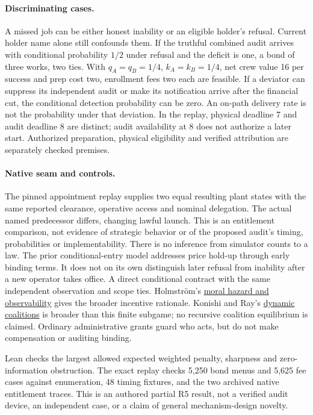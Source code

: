 \documentclass[11pt]{article}
\begin{document}
\paragraph{Discriminating cases.}
A missed job can be either honest inability or an eligible holder's
refusal. Current holder name alone still confounds them. If the
truthful combined audit arrives with conditional probability \(1/2\)
under refusal and the deficit is one, a bond of three works, two ties.
With \(q_A=q_B=1/4\), \(k_A=k_B=1/4\), net crew value 16 per success
and prep cost two, enrollment fees two each are feasible. If a
deviator can suppress its independent audit or make its notification
arrive after the financial cut, the conditional detection probability
can be zero. An on-path delivery rate is not the probability under
that deviation. In the replay, physical deadline 7 and audit
deadline 8 are distinct; audit availability at 8 does not authorize
a later start. Authorized preparation, physical eligibility and
verified attribution are separately checked premises.

\paragraph{Native seam and controls.}
The pinned appointment replay supplies two equal resulting plant
states with the same reported clearance, operative access and nominal
delegation. The actual named predecessor differs, changing lawful
launch. This is an entitlement comparison, not evidence of strategic
behavior or of the proposed audit's timing, probabilities or
implementability. There is no inference from simulator counts to a law.
The prior conditional-entry model addresses price hold-up through
early binding terms. It does not on its own distinguish later refusal
from inability after a new operator takes office. A direct conditional
contract with the same independent observation and scope ties.
Holmstr\"om's \href{https://personal.utdallas.edu/~nina.baranchuk/Fin7310/papers/Holmstrom1979.pdf}{moral hazard and observability}
gives the broader incentive rationale. Konishi and Ray's
\href{https://pages.nyu.edu/debraj/Papers/KonishiRay.pdf}{dynamic
coalitions} is broader than this finite subgame; no recursive
coalition equilibrium is claimed. Ordinary administrative grants
guard who acts, but do not make compensation or auditing binding.

Lean checks the largest allowed expected weighted penalty, sharpness
and zero-information obstruction. The exact replay checks 5,250
bond menus and 5,625 fee cases against enumeration, 48 timing
fixtures, and the two archived native entitlement traces.
This is an authored partial R5 result, not a verified audit device,
an independent case, or a claim of general mechanism-design novelty.
\end{document}
